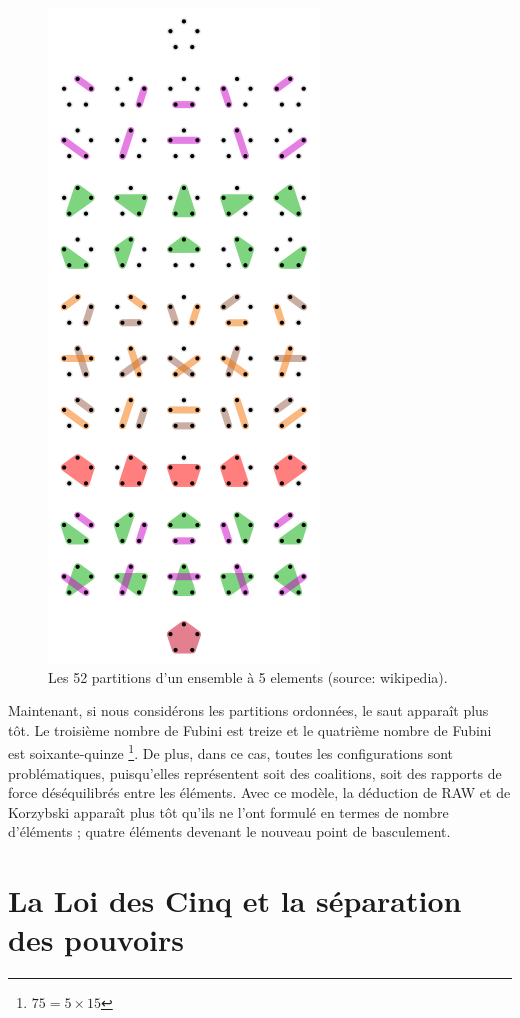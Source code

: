 \begin{figure}
\begin{center}
\includegraphics[scale=0.7]{./img/part.png}
\caption{\label{part} Les 52 partitions d'un ensemble à 5 elements (source: wikipedia).}
\end{center}
\end{figure}

Maintenant, si nous considérons les partitions ordonnées, le saut apparaît plus tôt. Le troisième nombre de Fubini est treize et le quatrième nombre de Fubini est soixante-quinze \footnote{$75=5\times 15$ }. De plus, dans ce cas, toutes les configurations sont problématiques, puisqu'elles représentent soit des coalitions, soit des rapports de force déséquilibrés entre les éléments. Avec ce modèle, la déduction de RAW et de Korzybski apparaît plus tôt qu'ils ne l'ont formulé en termes de nombre d'éléments ; quatre éléments devenant le nouveau point de basculement.


\section*{La Loi des Cinq et la séparation des pouvoirs}

